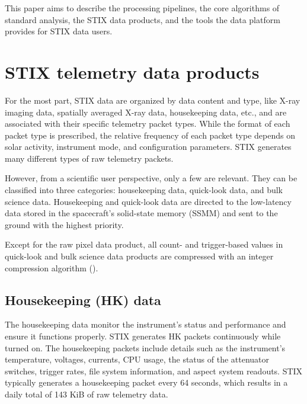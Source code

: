 \documentclass[referee]{preaa} %
\begin{document}
 This paper aims to describe the processing pipelines, the core algorithms of standard analysis, the STIX data products, and the tools the data platform provides for STIX data users.

\section{STIX telemetry data products}
\label{sec:raw-data}
For the most part, STIX data are organized by data content and type, like X-ray imaging data, spatially averaged X-ray data, housekeeping data, etc., and are associated with their specific telemetry packet types. While the format of each packet type is prescribed, the relative frequency of each packet type depends on solar activity, instrument mode, and configuration parameters. STIX generates many different types of raw telemetry packets.

However, from a scientific user perspective, only a few are relevant. They can be classified into three categories: housekeeping data, quick-look data, and bulk science data.
Housekeeping and quick-look data are directed to the low-latency data stored in the spacecraft's solid-state memory (SSMM) and sent to the ground with the highest priority.

Except for the raw pixel data product, all count- and trigger-based values in quick-look and bulk science data products are compressed with an integer compression algorithm (\citep{stix2020}).

\subsection{Housekeeping (HK) data}
 The housekeeping data monitor the instrument's status and performance and ensure it functions properly. STIX generates HK packets continuously while turned on. The housekeeping packets include details such as the instrument's temperature, voltages, currents, CPU usage, the status of the attenuator switches, trigger rates, file system information, and aspect system readouts. STIX typically generates a  housekeeping packet every 64 seconds, which results in a daily total of 143 KiB of raw telemetry data.
 
\end{document}
